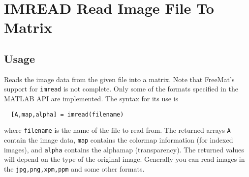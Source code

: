 \section{IMREAD Read Image File To Matrix}

\subsection{Usage}

Reads the image data from the given file into a matrix.  Note that
FreeMat's support for \verb|imread| is not complete.  Only some of the
formats specified in the MATLAB API are implemented.  The syntax
for its use is
\begin{verbatim}
  [A,map,alpha] = imread(filename)
\end{verbatim}
where \verb|filename| is the name of the file to read from.  The returned
arrays \verb|A| contain the image data, \verb|map| contains the colormap information
(for indexed images), and \verb|alpha| contains the alphamap (transparency).
The returned values will depend on the type of the original image.  Generally
you can read images in the \verb|jpg,png,xpm,ppm| and some other formats.
